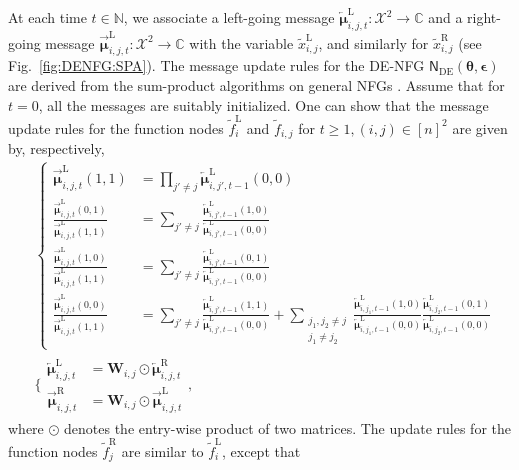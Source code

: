 \documentclass[conference]{IEEEtran}
\theoremstyle{plain}
\theoremstyle{definition}
\providecommand{\N}{\mathbb {N}}
\providecommand{\C}{\mathbb {C}}
\newcommand{\sfn}{\mathsf{N}}
\newcommand{\tfr}[1]{\widetilde{f}^{\mathrm{R}}_{ #1 }}
\newcommand{\tfl}[1]{\widetilde{f}^{\mathrm{L}}_{ #1 }}
\newcommand{\tfe}[1]{\widetilde {f}_{ #1 }}
\newcommand{\txr}[1]{\widetilde{x}^{\mathrm{R}}_{ #1 }}
\newcommand{\txl}[1]{\widetilde{x}^{\mathrm{L}}_{ #1 }}
\newcommand{\muleft}[2]{\overleftarrow{\boldsymbol{\mu}}^{\mathrm{#1}}_{#2}}
\newcommand{\muright}[2]{\overrightarrow{\boldsymbol{\mu}}^{\mathrm{#1}}_{#2}}
\newcommand{\btheta}{\boldsymbol{\theta}}
\newcommand{\sfnDE}{\sfn_{\mathrm{DE}}}
\begin{document}
 At each time $t\in\N$, we associate a left-going message
 $\muleft{L}{i,j,t}:\mathcal X^2\to\C$ and a right-going message
 $\muright{L}{i,j,t}:\mathcal X^2\to\C$ with the variable $\txl{i,j}$, and
 similarly for $\txr{i,j}$ (see Fig.~\ref{fig:DENFG:SPA}). The message update
 rules for the DE-NFG $\sfnDE(\btheta,\boldsymbol{\epsilon})$ are derived from
 the sum-product algorithms on general NFGs
 \cite{loeligerIntroductionFactorGraphs2004}. Assume that for $t=0$, all the
 messages are suitably initialized. One can show that the message update rules
 for the function nodes $\tfl{i}$ and $\tfe{i,j}$ for $t\geq 1, (i,j)\in[n]^2$
 are given by, respectively,
 \begin{equation*}
  \begin{split}
    & \left\{\begin{split}
              \muright{L}{i,j,t}(1,1) & =\prod_{j'\neq j}\muleft{L}{i,j',t-1}(0,0)                                  \\
              \frac{\muright{L}{i,j,t}(0,1)}{\muright{L}{i,j,t}(1,1)}
                                      & =\sum_{j'\neq j}\frac{\muleft{L}{i,j',t-1}(1,0)}{\muleft{L}{i,j',t-1}(0,0)} \\
              \frac{\muright{L}{i,j,t}(1,0)}{\muright{L}{i,j,t}(1,1)}
                                      & =\sum_{j'\neq j}\frac{\muleft{L}{i,j',t-1}(0,1)}{\muleft{L}{i,j',t-1}(0,0)} \\
              \frac{\muright{L}{i,j,t}(0,0)}{\muright{L}{i,j,t}(1,1)}
                                      & =\sum_{j'\neq j}\frac{\muleft{L}{i,j',t-1}(1,1)}{\muleft{L}{i,j',t-1}(0,0)}
              +\sum_{\substack{j_1,j_2\neq j                                                                        \\j_1\neq j_2}}\frac{\muleft{L}{i,j_1,t-1}(1,0)}{\muleft{L}{i,j_1,t-1}
               (0,0)}\frac{\muleft{L}{i,j_2,t-1}(0,1)}{\muleft{L}{i,j_2,t-1}(0,0)}
             \end{split}\right. \\
    & \Bigg\{\begin{split}
              \muleft{L}{i,j,t}  & =\mathbf W_{i,j}\odot \muleft{R}{i,j,t}  \\
              \muright{R}{i,j,t} & =\mathbf W_{i,j}\odot \muright{L}{i,j,t}
             \end{split},
  \end{split}
 \end{equation*}
 where $\odot$ denotes the entry-wise product of two matrices.
 The update rules for the function nodes $\tfr{j}$ are similar to $\tfl{i}$, except that
\end{document}

